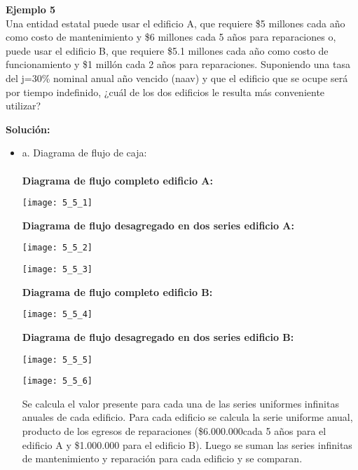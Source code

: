 \textbf{Ejemplo 5}\\
Una entidad estatal puede usar el edificio A, que requiere \$5 millones cada año como costo de mantenimiento y \$6 millones cada 5 años para reparaciones o, puede usar el edificio B, que requiere \$5.1 millones cada año como costo de funcionamiento y \$1 millón cada 2 años para reparaciones. Suponiendo una tasa del j=30\% nominal anual año vencido (naav) y que el edificio que se ocupe será por tiempo indefinido, ¿cuál de los dos edificios le resulta más conveniente utilizar?

\textbf{Solución:}\\
\begin{itemize}
	\item a. Diagrama de flujo de caja:\\
\\
	\textbf{Diagrama de flujo completo 	edificio A:}
	\begin{center}
		\texttt{[image: 5\_5\_1]}\\
	\end{center}
	\textbf{Diagrama de flujo desagregado en dos series	edificio A:}
		\begin{center}
		\texttt{[image: 5\_5\_2]}\\
	\end{center}
		\begin{center}
		\texttt{[image: 5\_5\_3]}\\
	\end{center}
	\textbf{Diagrama de flujo completo edificio B:}
	\begin{center}
		\texttt{[image: 5\_5\_4]}\\
	\end{center}
	\textbf{Diagrama de flujo desagregado en dos series	edificio B:}
		\begin{center}
		\texttt{[image: 5\_5\_5]}\\
	\end{center}
		\begin{center}
		\texttt{[image: 5\_5\_6]}\\
	\end{center}
	
	Se calcula el valor presente para cada una de las series uniformes infinitas anuales de cada edificio. Para cada edificio se calcula la serie uniforme anual, producto de los egresos de reparaciones (\$6.000.000cada 5 años para el edificio A y \$1.000.000 para el edificio B). Luego se suman las series infinitas de mantenimiento y reparación para cada edificio y se comparan.
	

\end{itemize}
